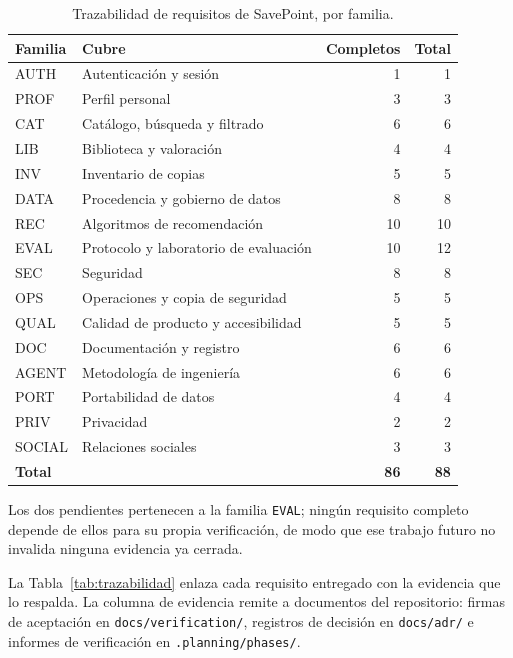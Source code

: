\begin{table}[H]
\centering
\caption{Trazabilidad de requisitos de SavePoint, por familia.}\label{tab:trazabilidad-familias}
\tablecompact
\begin{tabularx}{\textwidth}{@{}>{\ttfamily\raggedright\arraybackslash}p{}Yrr@{}}
\textnormal{Familia} & \textnormal{Cubre} & \textnormal{Completos} & \textnormal{Total} \\
\hline
AUTH & Autenticación y sesión & 1 & 1 \\
PROF & Perfil personal & 3 & 3 \\
CAT & Catálogo, búsqueda y filtrado & 6 & 6 \\
LIB & Biblioteca y valoración & 4 & 4 \\
INV & Inventario de copias & 5 & 5 \\
DATA & Procedencia y gobierno de datos & 8 & 8 \\
REC & Algoritmos de recomendación & 10 & 10 \\
EVAL & Protocolo y laboratorio de evaluación & 10 & 12 \\
SEC & Seguridad & 8 & 8 \\
OPS & Operaciones y copia de seguridad & 5 & 5 \\
QUAL & Calidad de producto y accesibilidad & 5 & 5 \\
DOC & Documentación y registro & 6 & 6 \\
AGENT & Metodología de ingeniería & 6 & 6 \\
PORT & Portabilidad de datos & 4 & 4 \\
PRIV & Privacidad & 2 & 2 \\
SOCIAL & Relaciones sociales & 3 & 3 \\
\hline
\textbf{Total} & & \textbf{86} & \textbf{88} \\
\end{tabularx}
\end{table}

Los dos pendientes pertenecen a la familia \texttt{EVAL}; ningún requisito completo depende
de ellos para su propia verificación, de modo que ese trabajo futuro no invalida ninguna
evidencia ya cerrada.

La Tabla~\ref{tab:trazabilidad} enlaza cada requisito entregado con la evidencia que lo
respalda. La columna de evidencia remite a documentos del repositorio: firmas de aceptación
en \texttt{docs/verification/}, registros de decisión en \texttt{docs/adr/} e informes de
verificación en \texttt{.planning/phases/}.

